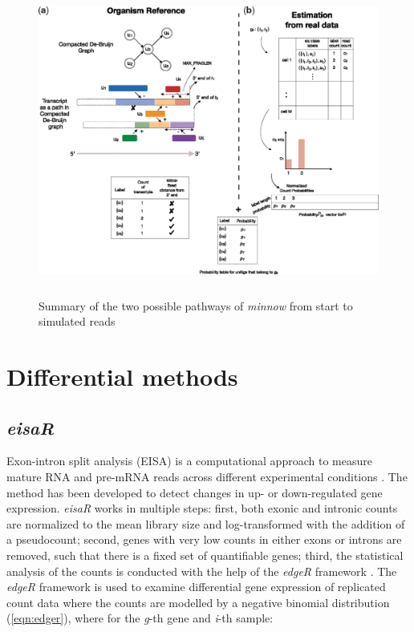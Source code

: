 \begin{figure}[!htb]
\begin{center}
\includegraphics[width=6in,height=4in]{../figures/simulation/minnow_process.jpg}
\end{center}
\caption{Summary of the two possible pathways of \emph{minnow} from start to simulated reads \citep{minnow}}
\label{fig:minnow_process}
\end{figure}
\FloatBarrier

\section{Differential methods}

\subsection{\emph{eisaR}}
Exon-intron split analysis (EISA) is a computational approach to measure mature RNA and pre-mRNA reads across different experimental conditions \citep{eisar}. The method has been developed to detect changes in up- or down-regulated gene expression. \emph{eisaR} works in multiple steps: first, both exonic and intronic counts are normalized to the mean library size and log-transformed with the addition of a pseudocount; second, genes with very low counts in either exons or introns are removed, such that there is a fixed set of quantifiable genes; third, the statistical analysis of the counts is conducted with the help of the \emph{edgeR} framework \citep{edger}. The \emph{edgeR} framework is used to examine differential gene expression of replicated count data where the counts are modelled by a negative binomial distribution (\ref{eqn:edger}), where for the \emph{g}-th gene and \emph{i}-th sample:

